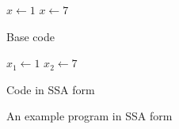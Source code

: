 \begin{figure}[h]
    \begin{minipage}[t]{0.5\textwidth}
        \centering
        \begin{algorithmic}
            \State $x \gets 1$
            \State {}
            \State $x \gets 7$
            \State {}
        \end{algorithmic}
        Base code
    \end{minipage}
    \begin{minipage}[t]{0.5\textwidth}
        \centering
        \begin{algorithmic}
            \State $x_1 \gets 1$
            \State {}
            \State $x_2 \gets 7$
            \State {}
        \end{algorithmic}
        Code in SSA form
    \end{minipage}
    \caption{An example program in SSA form}
    \label{fig:basics:SSA-simple}
\end{figure}